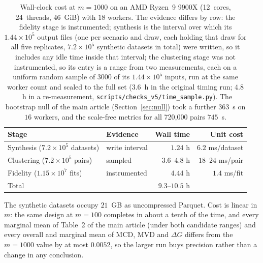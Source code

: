 \documentclass[pdflatex,referee]{sn-jnl}
\begin{document}
\begin{table}[!htbp]
\centering
\caption{Wall-clock cost at $m = 1000$ on an AMD Ryzen~9 9900X (12~cores,
         24~threads, $46$~GiB) with $18$ workers. The evidence differs by row:
         the fidelity stage is instrumented; synthesis is the interval over
         which its $1.44 \times 10^{5}$ output files (one per scenario and draw,
         each holding that draw for all five replicates, $7.2 \times 10^{5}$
         synthetic datasets in total) were written, so it includes any
         idle time inside that interval; the clustering stage was not
         instrumented, so its entry is a range from two measurements, each on
         a uniform random sample of $3000$ of its $1.44 \times 10^{5}$ inputs,
         run at the same worker count and scaled to the full set ($3.6$~h in
         the original timing run; $4.8$~h in a re-measurement,
         \texttt{scripts/checks\_v5/time\_sample.py}). The
         bootstrap null of the main article (Section~\ref{sec:null}) took a
         further $363$~s on $16$ workers, and the scale-free metrics for all
         720{,}000 pairs $745$~s.}
\label{tabS:cost}
\small
\begin{tabular}{llrr}
\toprule
Stage & Evidence & Wall time & Unit cost \\
\midrule
Synthesis ($7.2 \times 10^{5}$ datasets)  & write interval & $1.24$ h & $6.2$ ms/dataset \\
Clustering ($7.2 \times 10^{5}$ pairs)    & sampled        & $3.6$--$4.8$ h & $18$--$24$ ms/pair \\
Fidelity ($1.15 \times 10^{7}$ fits)      & instrumented   & $4.44$ h & $1.4$ ms/fit \\
\midrule
Total & & $9.3$--$10.5$ h & \\
\bottomrule
\end{tabular}
\end{table}

The synthetic datasets occupy $21$~GB as uncompressed Parquet. Cost is linear in
$m$: the same design at $m = 100$ completes in about a tenth of the time, and
every marginal mean of Table~2 of the main article (under both candidate
ranges) and every overall and marginal mean of MCD, MVD and $\Delta G$ differs
from the $m = 1000$ value by at most $0.0052$, so the larger run buys precision
rather than a change in any conclusion.

\clearpage

\end{document}
